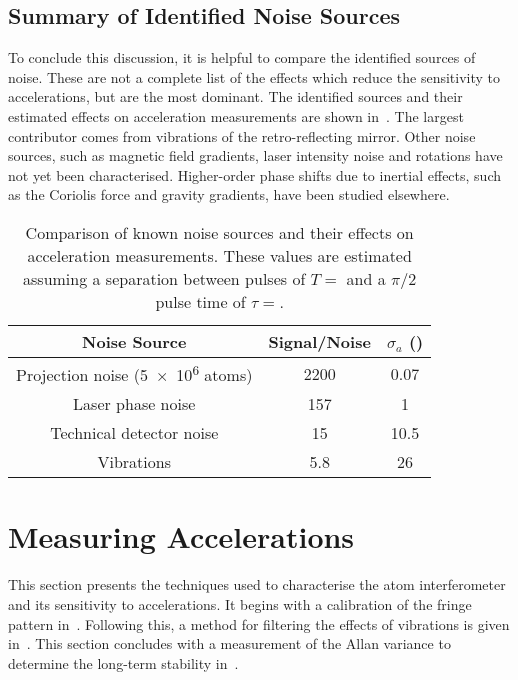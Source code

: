 \subsection{Summary of Identified Noise Sources}\label{subsec:noise_sources}
To conclude this discussion, it is helpful to compare the identified
sources of noise. These are not a complete list of the effects which
reduce the sensitivity to accelerations, but are the most dominant. The
identified sources and their estimated effects on acceleration
measurements are shown in~. The largest
contributor comes from vibrations of the retro-reflecting mirror.
Other noise sources, such as magnetic field gradients, laser intensity
noise and rotations have not yet been characterised. Higher-order
phase shifts due to inertial effects, such as the Coriolis force and
gravity gradients, have been
studied elsewhere\cite{Bongs2006}.
\begin{table}[htpb!]
  \centering
  \begin{tabular}{ccc}
    \toprule
    Noise Source & Signal/Noise & \(\sigma_a\)
    (\sivalue{}{\micro\meter\per\s\squared}) \\
    \midrule
    Projection noise (\num{5e6} atoms) & 2200 & 0.07 \\
    Laser phase noise & 157 & 1 \\
    Technical detector noise & 15 & 10.5 \\
    Vibrations & 5.8 & 26\\
    \bottomrule
  \end{tabular}
  \caption[Comparison of known noise sources.]{Comparison of known noise sources and their effects on
  acceleration measurements. These values are estimated assuming a
separation between pulses of \(T = \) and a \(\pi/2\)
pulse time of \(\tau = \).}
  \label{tab:noise_sources}
\end{table}
\section{Measuring Accelerations}\label{sec:atomint_accelerations}
This section presents the techniques used to characterise the atom interferometer
and its sensitivity to accelerations. It begins with a calibration of
the fringe pattern in~. Following this, a
method for filtering the effects of vibrations is given
in~. This section concludes with
a measurement of the Allan variance to determine the long-term
stability in~.
